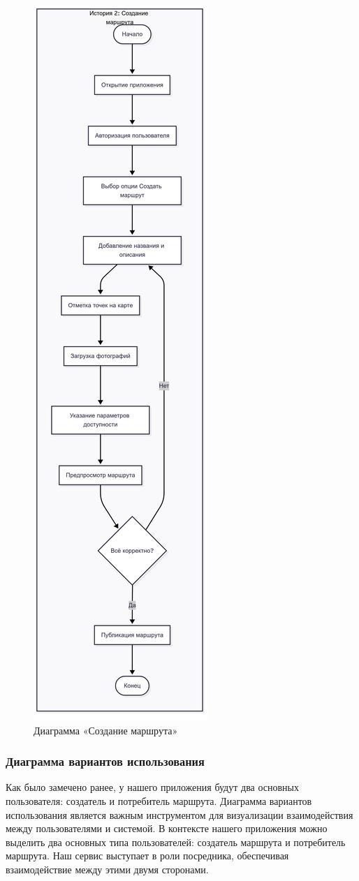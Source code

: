 \begin{itemize}
    \begin{figure}
        \centering
        \includegraphics[width=0.3\linewidth]{Images/mobile_logic/создание_маршрута-2025-04-13-180512.png}
        \caption{Диаграмма «Создание маршрута»}
        \label{fig:create_route}
    \end{figure}
\end{itemize}

\subsubsection*{Диаграмма вариантов использования}

Как было замечено ранее, у нашего приложения будут два основных пользователя: создатель и потребитель маршрута. Диаграмма вариантов использования является важным инструментом для визуализации взаимодействия между пользователями и системой. В контексте нашего приложения можно выделить два основных типа пользователей: создатель маршрута и потребитель маршрута. Наш сервис выступает в роли посредника, обеспечивая взаимодействие между этими двумя сторонами.

